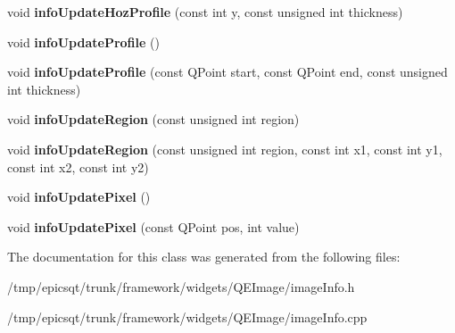 \begin{DoxyCompactItemize}
\item 
\hypertarget{classimageInfo_af3bc6c7ab51ade831513593e5ec37bc8}{
void {\bfseries infoUpdateHozProfile} (const int y, const unsigned int thickness)}
\label{classimageInfo_af3bc6c7ab51ade831513593e5ec37bc8}

\item 
\hypertarget{classimageInfo_ae8b92f5270d9f68e36408d5d7b0070bf}{
void {\bfseries infoUpdateProfile} ()}
\label{classimageInfo_ae8b92f5270d9f68e36408d5d7b0070bf}

\item 
\hypertarget{classimageInfo_ae3b4a16888ce04800841e586aafbeb1b}{
void {\bfseries infoUpdateProfile} (const QPoint start, const QPoint end, const unsigned int thickness)}
\label{classimageInfo_ae3b4a16888ce04800841e586aafbeb1b}

\item 
\hypertarget{classimageInfo_a553687717aa2326bc9ae40c45ef738b3}{
void {\bfseries infoUpdateRegion} (const unsigned int region)}
\label{classimageInfo_a553687717aa2326bc9ae40c45ef738b3}

\item 
\hypertarget{classimageInfo_a4dcd105500ad0179741128405478f5cb}{
void {\bfseries infoUpdateRegion} (const unsigned int region, const int x1, const int y1, const int x2, const int y2)}
\label{classimageInfo_a4dcd105500ad0179741128405478f5cb}

\item 
\hypertarget{classimageInfo_a70e991916e7e8d316f2acd82a22913d2}{
void {\bfseries infoUpdatePixel} ()}
\label{classimageInfo_a70e991916e7e8d316f2acd82a22913d2}

\item 
\hypertarget{classimageInfo_a0bf41ad48a5a379839425f1d91ebe737}{
void {\bfseries infoUpdatePixel} (const QPoint pos, int value)}
\label{classimageInfo_a0bf41ad48a5a379839425f1d91ebe737}

\end{DoxyCompactItemize}


The documentation for this class was generated from the following files:\begin{DoxyCompactItemize}
\item 
/tmp/epicsqt/trunk/framework/widgets/QEImage/imageInfo.h\item 
/tmp/epicsqt/trunk/framework/widgets/QEImage/imageInfo.cpp\end{DoxyCompactItemize}
